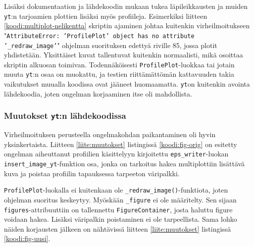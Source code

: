 \documentclass[12pt,a4paper]{article}
\newcommand{\yt}{\texttt{yt}}
\begin{document}
Lisäksi dokumentaation \cite{multiplot-api} ja lähdekoodin \cite{multiplot-source} mukaan tukea läpileikkausten ja muiden \yt :n tarjoamien plottien lisäksi myös profiileja. Esimerkiksi liitteen \ref{koodi:multiplot-nelikentta} skriptin ajaminen johtaa kuitenkin virheilmoitukseen "\texttt{AttributeError: 'ProfilePlot' object has no attribute '\_redraw\_image'}" ohjelman suorituksen edettyä riville 85, jossa plotit yhdistetään. Yksittäiset kuvat tallentuvat kuitenkin normaalisti, mikä osoittaa skriptin alkuosan toimivan. Todennäköisesti \texttt{ProfilePlot}-luokkaa tai jotain muuta \yt :n osaa on muokattu, ja testien riittämättömän kattavuuden takia vaikutukset muualla koodissa ovat jääneet huomaamatta. \yt on kuitenkin avointa lähdekoodia, joten ongelman korjaaminen itse oli mahdollista.



\subsubsection{Muutokset \yt :n lähdekoodissa}
Virheilmoituksen perusteella ongelmakohdan paikantaminen oli hyvin yksinkertaista. Liitteen \ref{liite:muutokset} listingissä \ref{koodi:fig-orig} on esitetty ongelman aiheuttanut profiilien käsittelyyn kirjoitettu \texttt{eps\_writer}-luokan \texttt{insert\_image\_yt}-funktion osa, jonka on tarkoitus hakea multiplottiin lisättävä kuva ja poistaa profiilin tapauksessa tarpeeton väripalkki.

\texttt{ProfilePlot}-luokalla ei kuitenkaan ole \texttt{\_redraw\_image()}-funktiota, joten ohjelman suoritus keskeytyy. Myöskään \texttt{\_figure} ei ole määritelty. Sen sijaan \texttt{figures}-attribuuttiin on tallennettu \texttt{FigureContainer}, josta haluttu figure voidaan hakea. Lisäksi väripalkin poistaminen ei ole tarpeellista. Sama lohko näiden korjausten jälkeen on nähtävissä liitteen \ref{liite:muutokset} listingissä \ref{koodi:fig-uusi}.
\end{document}
